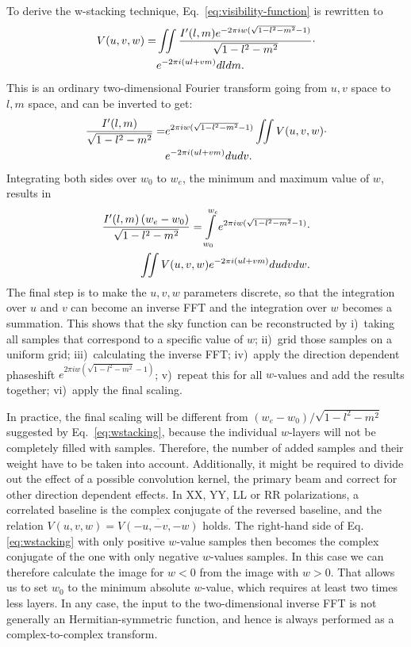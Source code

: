 \documentclass[useAMS,usenatbib]{mn2e}
\begin{document}
To derive the w-stacking technique, Eq.~\eqref{eq:visibility-function} is rewritten to
\begin{align}\notag
V(u,v,w) = & \iint \frac{I'(l,m) e^{-2\pi i w(\sqrt{1-l^2-m^2}-1)}}{\sqrt{1-l^2-m^2}} \cdot \\ \notag
& e^{-2\pi i \left(ul + vm\right)} dl dm.
\end{align}
This is an ordinary two-dimensional Fourier transform going from $u,v$ space to $l,m$ space, and can be inverted to get:
\begin{align}\notag
\frac{I'(l,m)}{\sqrt{1-l^2-m^2}} = & e^{2\pi i w(\sqrt{1-l^2-m^2}-1)} \iint V(u,v,w) \cdot \\ \notag
& e^{-2\pi i \left(ul + vm\right)} du dv.
\end{align}
Integrating both sides over $w_0$ to $w_e$, the minimum and maximum value of $w$, results in
\begin{align}\notag
\frac{I'(l,m)\left(w_e - w_0\right)}{\sqrt{1-l^2-m^2}} = \int\limits_{w_0}^{w_e} e^{2\pi i w(\sqrt{1-l^2-m^2}-1)} \cdot \\ \label{eq:wstacking}
\iint V(u,v,w)  e^{-2\pi i \left(ul + vm\right)} du dv dw.
\end{align}
The final step is to make the $u,v,w$ parameters discrete, so that the integration over $u$ and $v$ can become an inverse FFT and the integration over $w$ becomes a summation. This shows that the sky function can be reconstructed by i)~taking all samples that correspond to a specific value of $w$; ii)~grid those samples on a uniform grid; iii)~calculating the inverse FFT; iv)~apply the direction dependent phaseshift $e^{2\pi i w(\sqrt{1-l^2-m^2}-1)}$; v)~repeat this for all $w$-values and add the results together; vi)~apply the final scaling.

In practice, the final scaling will be different from $\left(w_e - w_0\right)/\sqrt{1-l^2-m^2}$ suggested by Eq.~\eqref{eq:wstacking}, because the individual $w$-layers will not be completely filled with samples. Therefore, the number of added samples and their weight have to be taken into account. Additionally, it might be required to divide out the effect of a possible convolution kernel, the primary beam and correct for other direction dependent effects. In XX, YY, LL or RR polarizations, a correlated baseline is the complex conjugate of the reversed baseline, and the relation $V(u,v,w)=\overline{V(-u,-v,-w)}$ holds. The right-hand side of Eq.\eqref{eq:wstacking} with only positive $w$-value samples then becomes the complex conjugate of the one with only negative $w$-values samples. In this case we can therefore calculate the image for $w<0$ from the image with $w>0$. That allows us to set $w_0$ to the minimum absolute $w$-value, which requires at least two times less layers. In any case, the input to the two-dimensional inverse FFT is not generally an Hermitian-symmetric function, and hence is always performed as a complex-to-complex transform. 
\end{document}
